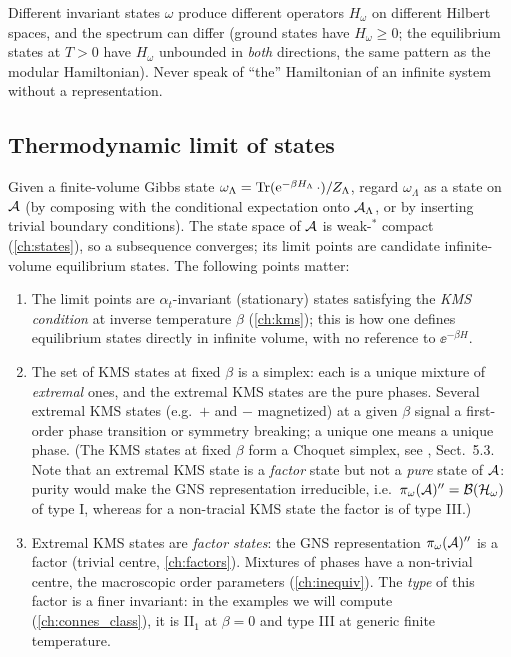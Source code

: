 \begin{whatwrong}
Different invariant states $\omega$ produce different operators $H_\omega$ on different Hilbert spaces, and the spectrum can differ (ground states have $H_\omega\ge0$; the equilibrium states at $T>0$ have $H_\omega$ unbounded in \emph{both} directions, the same pattern as the modular Hamiltonian). Never speak of ``the'' Hamiltonian of an infinite system without a representation.
\end{whatwrong}

\subsection{Thermodynamic limit of states}

Given a finite-volume Gibbs state $\omega_\Lambda=\operatorname{Tr}(\mathrm{e}^{-\beta H_\Lambda}\,\cdot)/Z_\Lambda$, regard $\omega_\Lambda$ as a state on $\mathcal{A}$ (by composing with the conditional expectation onto $\mathcal{A}_\Lambda$, or by inserting trivial boundary conditions). The state space of $\mathcal{A}$ is weak-$^*$ compact (\cref{ch:states}), so a subsequence converges; its limit points are candidate infinite-volume equilibrium states. The following points matter:
\begin{enumerate}
\item The limit points are $\alpha_t$-invariant (stationary) states satisfying the \emph{KMS condition} at inverse temperature $\beta$ (\cref{ch:kms}); this is how one defines equilibrium states directly in infinite volume, with no reference to $\ee^{-\beta H}$.
\item The set of KMS states at fixed $\beta$ is a simplex: each is a unique mixture of \emph{extremal} ones, and the extremal KMS states are the pure phases. Several extremal KMS states (e.g.\ $+$ and $-$ magnetized) at a given $\beta$ signal a first-order phase transition or symmetry breaking; a unique one means a unique phase. (The KMS states at fixed $\beta$ form a Choquet simplex, see \cite{BratteliRobinson2}, Sect.~5.3. Note that an extremal KMS state is a \emph{factor} state but not a \emph{pure} state of $\mathcal{A}$: purity would make the GNS representation irreducible, i.e.\ $\pi_\omega(\mathcal{A})''=\mathcal{B}(\mathcal{H}_\omega)$ of type I, whereas for a non-tracial KMS state the factor is of type III.)
\item Extremal KMS states are \emph{factor states}: the GNS representation $\pi_\omega(\mathcal{A})''$ is a factor (trivial centre, \cref{ch:factors}). Mixtures of phases have a non-trivial centre, the macroscopic order parameters (\cref{ch:inequiv}). The \emph{type} of this factor is a finer invariant: in the examples we will compute (\cref{ch:connes_class}), it is II$_1$ at $\beta=0$ and type III at generic finite temperature.
\end{enumerate}

